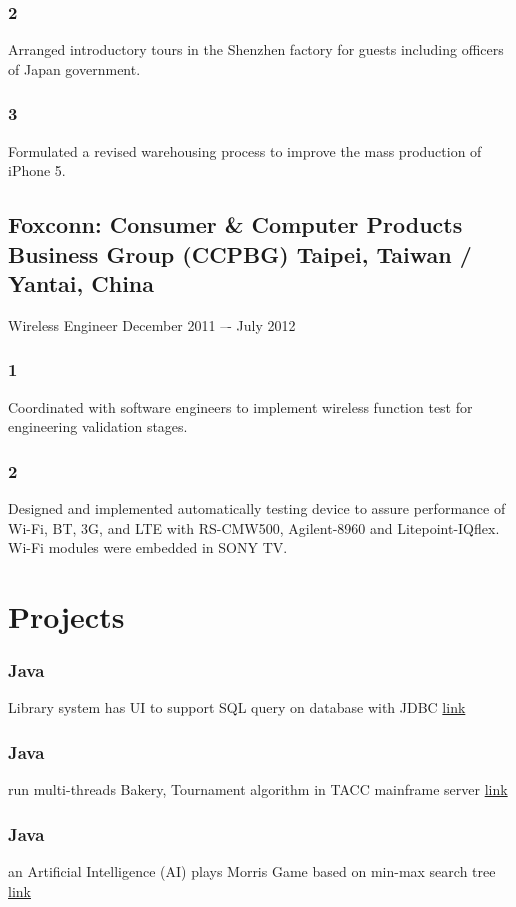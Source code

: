 \documentclass[letterpaper,11pt]{article}
\begin{document}
\subsubsection{2} Arranged introductory tours in the Shenzhen factory for guests including officers of Japan government.
\subsubsection{3} Formulated a revised warehousing process to improve the mass production of iPhone 5.
\subsection{Foxconn: \normalfont Consumer \& Computer Products Business Group (CCPBG) \hfill\small\normalfont Taipei, Taiwan / Yantai, China}
Wireless Engineer \hfill\small\normalfont December 2011 –- July 2012
\subsubsection{1} Coordinated with software engineers to implement wireless function test for engineering validation stages.
\subsubsection{2} Designed and implemented automatically testing device to assure performance of Wi-Fi, BT, 3G, and LTE with RS-CMW500, Agilent-8960 and Litepoint-IQflex. Wi-Fi modules were embedded in SONY TV.


\section{Projects}
\subsubsection{Java} Library system has UI to support SQL query on database with JDBC 
\href{https://github.com/fatliau/SQL_LibrarySystemProject}{\hfill link} 
\subsubsection{Java} run multi-threads Bakery, Tournament algorithm in TACC mainframe server
\href{https://github.com/fatliau/Multithread-programming}{\hfill link} 
\subsubsection{Java} an Artificial Intelligence (AI) plays Morris Game based on min-max search tree
\href{https://github.com/fatliau/AI_ChessGame}{\hfill link} 
\end{document}
